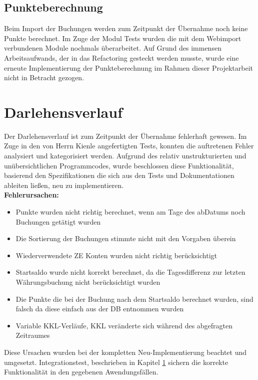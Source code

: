 \documentclass[12pt,             %
               a4paper,          %
               listof=totoc,     %
               index=totoc,      %
               bibliography=totoc,%
               oneside,         %
               BCOR1cm,          %
               english   %
               ]{scrbook}
\begin{document}
\subsection{Punkteberechnung}
Beim Import der Buchungen werden zum Zeitpunkt der Übernahme noch keine Punkte berechnet. Im Zuge der Modul Tests wurden die mit dem Webimport verbundenen Module nochmals überarbeitet. Auf Grund des immensen Arbeitsaufwands, der in das Refactoring gesteckt werden musste, wurde eine erneute Implementierung der Punkteberechnung im Rahmen dieser Projektarbeit nicht in Betracht gezogen. 

\section{Darlehensverlauf}
Der Darlehensverlauf ist zum Zeitpunkt der Übernahme fehlerhaft gewesen. Im Zuge in den von Herrn Kienle angefertigten Tests, konnten die auftretenen Fehler analysiert und kategorisiert werden. Aufgrund des relativ unstrukturierten und unübersichtlichen Programmcodes, wurde beschlossen diese Funktionalität, basierend den Spezifikationen die sich aus den Tests und Dokumentationen ableiten ließen, neu zu implementieren.\\

\textbf{Fehlerursachen:}

\begin{itemize}
     \item{Punkte wurden nicht richtig berechnet, wenn am Tage des abDatums noch Buchungen getätigt wurden}
     \item{Die Sortierung der Buchungen stimmte nicht mit den Vorgaben überein}
     \item{Wiederverwendete ZE Konten wurden nicht richtig berücksichtigt}
     \item{Startsaldo wurde nicht korrekt berechnet, da die Tagesdifferenz zur letzten Währungsbuchung nicht berücksichtigt wurden}
     \item{Die Punkte die bei der Buchung nach dem Startsaldo berechnet wurden, sind falsch da diese einfach aus der DB entnommen wurden}
     \item{Variable KKL-Verläufe, KKL veränderte sich während des abgefragten Zeitraumes}
\end{itemize} 

Diese Ursachen wurden bei der kompletten Neu-Implementierung beachtet und umgesetzt. Integrationstest, beschrieben in Kapitel \ref{} sichern die korrekte Funktionalität in den gegebenen Awendungsfällen.
\end{document}
